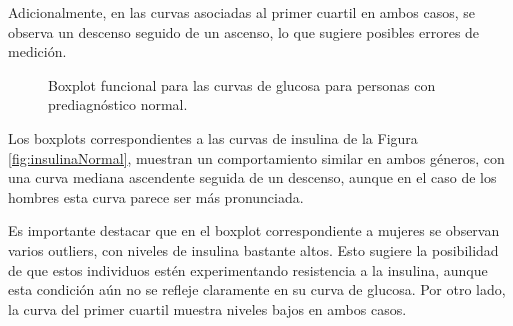 Adicionalmente, en las curvas asociadas al primer cuartil en ambos casos, se observa un descenso seguido de un ascenso, lo que sugiere posibles errores de medición.


\begin{figure}[H]
 \centering
    \caption{Boxplot funcional para las curvas de glucosa para personas con prediagnóstico normal.}
    \label{fig:glucosaNormal}
\end{figure}

Los boxplots correspondientes a las curvas de insulina de la Figura \ref{fig:insulinaNormal}, muestran un comportamiento similar en ambos géneros, con una curva mediana ascendente seguida de un descenso, aunque en el caso de los hombres esta curva parece ser más pronunciada.

Es importante destacar que en el boxplot correspondiente a mujeres se observan varios outliers, con niveles de insulina bastante altos. Esto sugiere la posibilidad de que estos individuos estén experimentando resistencia a la insulina, aunque esta condición aún no se refleje claramente en su curva de glucosa. Por otro lado, la curva del primer cuartil muestra niveles bajos en ambos casos.

